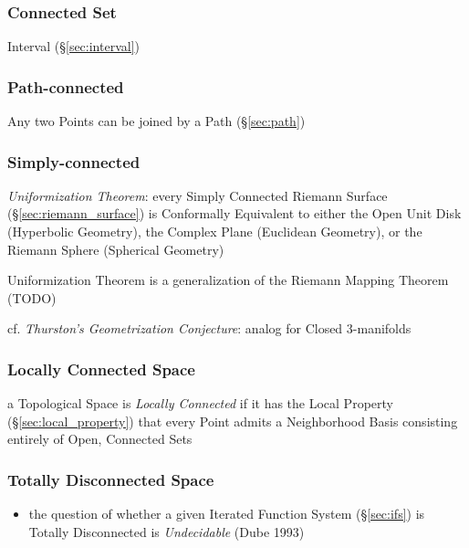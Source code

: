 \subsubsection{Connected Set}\label{sec:connected_set}

Interval (\S\ref{sec:interval})



\subsubsection{Path-connected}\label{sec:path_connected}

Any two Points can be joined by a Path (\S\ref{sec:path})



\subsubsection{Simply-connected}\label{sec:simply_connected}

\emph{Uniformization Theorem}: every Simply Connected Riemann Surface
(\S\ref{sec:riemann_surface}) is Conformally Equivalent to either the Open Unit
Disk (Hyperbolic Geometry), the Complex Plane (Euclidean Geometry), or the
Riemann Sphere (Spherical Geometry)

Uniformization Theorem is a generalization of the Riemann Mapping Theorem (TODO)

\fist cf. \emph{Thurston's Geometrization Conjecture}: analog for Closed
3-manifolds



\subsubsection{Locally Connected Space}\label{sec:locally_connected}

a Topological Space is \emph{Locally Connected} if it has the Local Property
(\S\ref{sec:local_property}) that every Point admits a Neighborhood Basis
consisting entirely of Open, Connected Sets



\subsubsection{Totally Disconnected Space}\label{sec:totally_disconnected}

\begin{itemize}
  \item the question of whether a given Iterated Function System
    (\S\ref{sec:ifs}) is Totally Disconnected is \emph{Undecidable} (Dube 1993)
\end{itemize}



